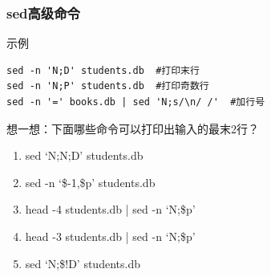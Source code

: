 \documentclass[xcolor=svgnames,presentation]{beamer}
\begin{document}
\begin{frame}[fragile]
\frametitle{sed高级命令}
\label{sec-2-1-13}
\begin{exampleblock}{示例}
\label{sec-2-1-13-1}


\begin{verbatim}
sed -n 'N;D' students.db  #打印末行
sed -n 'N;P' students.db  #打印奇数行
sed -n '=' books.db | sed 'N;s/\n/ /'  #加行号
\end{verbatim}
\end{exampleblock}
\begin{block}{想一想：下面哪些命令可以打印出输入的最末2行？}
\label{sec-2-1-13-2}

\begin{enumerate}
\item sed `N;N;D' students.db
\item sed -n `\$-1,\$p' students.db
\item head -4 students.db | sed -n `N;\$p'
\item head -3 students.db | sed -n `N;\$p'
\item sed `N;\$!D' students.db
\end{enumerate}
\end{block}
\end{frame}
\end{document}
